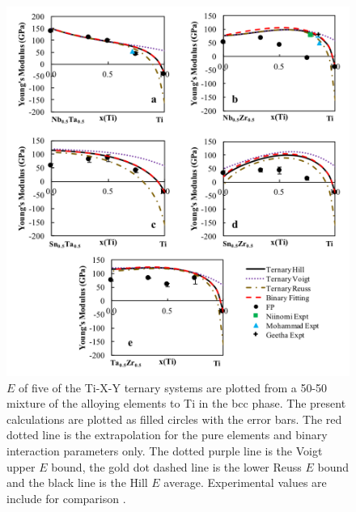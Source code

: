 \pagebreak
\begin{figure}[H]
	\centering
	\includegraphics[width=\textwidth]{Chapter-6/Figures/tixyyoungs2.png}
	\caption{$E$ of five of the Ti-X-Y ternary systems are plotted from a 50-50 mixture of the alloying elements to Ti in the bcc phase. The present calculations are plotted as filled circles with the error bars. The red dotted line is the extrapolation for the pure elements and binary interaction parameters only. The dotted purple line is the Voigt upper $E$ bound, the gold dot dashed line is the lower Reuss $E$ bound and the black line is the Hill $E$ average. Experimental values are include for comparison \cite{Niinomi2012,Mohammed2014,Nozoe2007,Geetha2009}.}
	\label{Ch6-figure:tixyyoungs2}
\end{figure}

